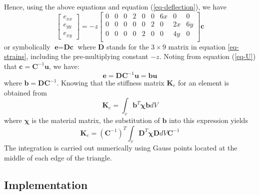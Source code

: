 \documentclass{llncs}
\begin{document}
Hence, using the above equations and equation (\ref{eq-deflection}), we have
\begin{equation}
\begin{bmatrix}
e_{xx} \\
e_{yy} \\
e_{xy}
\end{bmatrix}
= 
-z
\begin{bmatrix}
0 & 0 & 0 & 2 & 0 & 0 & 6x & 0 & 0 \\
0 & 0 & 0 & 0 & 0 & 2 & 0 & 2x & 6y \\
0 & 0 & 0 & 0 & 2 & 0 & 0 & 4y & 0 \\
\end{bmatrix}
\textbf{c}
\label{eq-strains}
\end{equation} 
or symbolically $\textbf{e} = \textbf{Dc}$ where $\textbf{D}$ stands for the $3\times 9$ matrix in equation \ref{eq-strains}, including the pre-multiplying constant $-z$. Noting from equation (\ref{eq-U}) that $\textbf{c} = \textbf{C}^{-1}\textbf{u}$, we have:
\begin{equation}
\textbf{e} = \textbf{DC}^{-1}\textbf{u} = \textbf{bu}
\end{equation} 
where $\textbf{b} = \textbf{DC}^{-1}$. 
Knowing that the stiffness matrix $\textbf{K}_e$ for an element is obtained from
\begin{equation}
\textbf{K}_e = \int_v \textbf{b}^{T} \boldsymbol\chi \textbf{b} dV
\end{equation} 
where $\boldsymbol\chi$ is the material matrix, the substitution of $\textbf{b}$ into this expression yields
\begin{equation}
\textbf{K}_e = (\textbf{C}^{-1})^T \int_v \textbf{D}^{T} \boldsymbol\chi \textbf{D} dV \textbf{C}^{-1}
\end{equation} 
The integration is carried out numerically using Gauss points located at the middle of each edge of the triangle. 

\subsection{Implementation}
\end{document}
